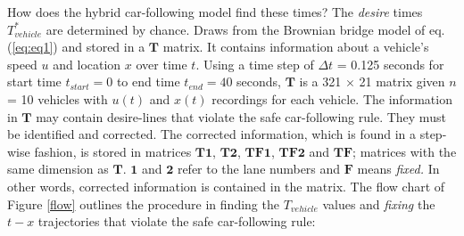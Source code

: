 \documentclass[Proceedings]{ascelike}
\begin{document}
How does the hybrid car-following model find these times? The  \emph{desire}  times  $T_{vehicle}^*$ are determined by chance. Draws from the Brownian bridge model of eq.(\ref{eq:eq1}) and stored in a $\mathbf{T}$ matrix. It contains information about a vehicle's speed $u$ and location $x$ over time $t$. Using a time step of $\Delta t$ = 0.125 seconds for start time $t_{start} = 0$ to end time $t_{end} = 40$ seconds, $\mathbf{T}$  is a  321 $\times$ 21 matrix given $n$ = 10 vehicles with  $u(t)$ and $x(t)$ recordings for each vehicle.  The information in $\mathbf{T}$ may contain desire-lines that violate the safe car-following rule. They must be identified and corrected. The corrected information, which is found in a step-wise fashion,  is stored in matrices $\mathbf{T1}$, $\mathbf{T2}$, $\mathbf{TF1}$, $\mathbf{TF2}$ and $\mathbf{TF}$; matrices with the same dimension as $\mathbf{T}$. $\mathbf{1}$ and $\mathbf{2}$ refer to the lane numbers and $\mathbf{F}$ means \emph{fixed.}  In other words, corrected information is contained in the matrix.  The flow chart of Figure \ref{flow} outlines the procedure in finding the  $T_{vehicle}$ values and \emph{fixing} the $t-x$ trajectories that violate the safe car-following rule:
\end{document}
